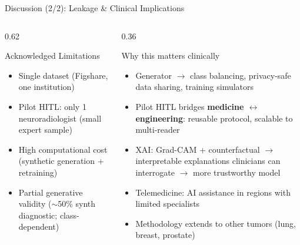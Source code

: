 \documentclass[aspectratio=169]{beamer}
\begin{document}
\begin{frame}{Discussion (2/2): Leakage \& Clinical Implications}
\begin{columns}[T]
\begin{column}{0.62\textwidth}
      \vspace{0.4em}
      {%
      \begin{block}{Acknowledged Limitations}
        \begin{itemize}\itemsep1pt
          \item Single dataset (Figshare, one institution)
          \item Pilot HITL: only 1 neuroradiologist (small expert sample)
          \item High computational cost (synthetic generation + retraining)
          \item Partial generative validity ($\sim$50\% synth diagnostic; class-dependent)
        \end{itemize}
      \end{block}}
    \end{column}
    \begin{column}{0.36\textwidth}
      {%
      \begin{block}{Why this matters clinically}
        \begin{itemize}\itemsep1pt
          \item Generator $\to$ class balancing, privacy-safe data sharing, training simulators
          \item Pilot HITL bridges \textbf{medicine $\leftrightarrow$ engineering}: reusable protocol, scalable to multi-reader
          \item XAI: Grad-CAM + counterfactual $\to$ interpretable explanations clinicians can interrogate $\to$ more trustworthy model
          \item Telemedicine: AI assistance in regions with limited specialists
          \item Methodology extends to other tumors (lung, breast, prostate)
        \end{itemize}
      \end{block}}
    \end{column}
  \end{columns}
\end{frame}

\end{document}
